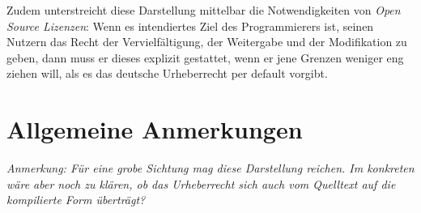 \documentclass[DIV=calc,BCOR=5mm,11pt,headings=small,oneside,abstract=true, toc=bib]{scrartcl}
\begin{document}
Zudem unterstreicht diese Darstellung mittelbar die Notwendigkeiten von
\emph{Open Source Lizenzen}: Wenn es intendiertes Ziel des Programmierers ist,
seinen Nutzern das Recht der Vervielfältigung, der Weitergabe und der
Modifikation zu geben, dann muss er dieses explizit gestattet, wenn er jene
Grenzen weniger eng ziehen will, als es das deutsche Urheberrecht per default
vorgibt.

\section{Allgemeine Anmerkungen}
{ \itshape Anmerkung: Für eine grobe Sichtung mag diese Darstellung reichen. Im
konkreten wäre aber noch zu klären, ob das Urheberrecht sich auch vom Quelltext
auf die kompilierte Form überträgt? }

\small

\end{document}
